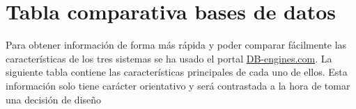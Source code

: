 \chapter{Tabla comparativa bases de datos\label{appendix:bases_de_datos}}

Para obtener información de forma más rápida y poder comparar fácilmente las características 
de los tres sistemas se ha usado el portal \href{https://db-engines.com/en/system/MongoDB\%3BPrometheus\%3BRedis}{DB-engines.com}. 
La siguiente tabla contiene las características principales de cada uno de ellos. Esta información
solo tiene carácter orientativo y será contrastada a la hora de tomar una decisión de diseño


